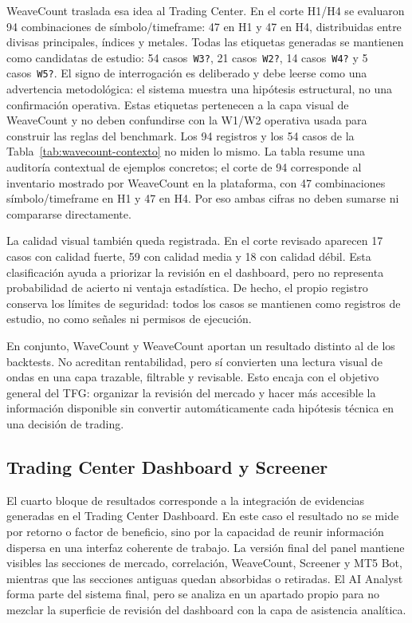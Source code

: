 WeaveCount traslada esa idea al Trading Center. En el corte H1/H4 se evaluaron
94 combinaciones de s\'imbolo/timeframe: 47 en H1 y 47 en H4, distribuidas entre
divisas principales, \'indices y metales. Todas las etiquetas generadas se mantienen
como candidatas de estudio: 54 casos~\texttt{W3?}, 21 casos~\texttt{W2?}, 14
casos~\texttt{W4?} y 5 casos~\texttt{W5?}. El signo de interrogaci\'on es
deliberado y debe leerse como una advertencia metodol\'ogica: el sistema muestra
una hip\'otesis estructural, no una confirmaci\'on operativa.
Estas etiquetas pertenecen a la capa visual de WeaveCount y no deben confundirse
con la W1/W2 operativa usada para construir las reglas del benchmark.
Los 94 registros y los 54 casos de la Tabla~\ref{tab:wavecount-contexto} no
miden lo mismo. La tabla resume una auditor\'ia contextual de ejemplos concretos;
el corte de 94 corresponde al inventario mostrado por WeaveCount en la
plataforma, con 47 combinaciones s\'imbolo/timeframe en H1 y 47 en H4. Por
eso ambas cifras no deben sumarse ni compararse directamente.

La calidad visual tambi\'en queda registrada. En el corte revisado aparecen 17
casos con calidad fuerte, 59 con calidad media y 18 con calidad d\'ebil. Esta
clasificaci\'on ayuda a priorizar la revisi\'on en el dashboard, pero no
representa probabilidad de acierto ni ventaja estad\'istica. De hecho, el propio
registro conserva los l\'imites de seguridad: todos los casos se mantienen
como registros de estudio, no como se\~nales ni permisos de ejecuci\'on.

En conjunto, WaveCount y WeaveCount aportan un resultado distinto al de los
backtests. No acreditan rentabilidad, pero s\'i convierten una lectura visual
de ondas en una capa trazable, filtrable y revisable. Esto encaja con el
objetivo general del TFG: organizar la revisi\'on del mercado y hacer m\'as
accesible la informaci\'on disponible sin convertir autom\'aticamente cada
hip\'otesis t\'ecnica en una decisi\'on de trading.

\subsection{Trading Center Dashboard y Screener}
\label{subsec:resultados-dashboard-screener}

El cuarto bloque de resultados corresponde a la integraci\'on de evidencias
generadas en el Trading Center Dashboard. En este caso el resultado no se mide
por retorno o factor de beneficio, sino por la capacidad de reunir informaci\'on
dispersa en una interfaz coherente de trabajo. La
versi\'on final del panel mantiene visibles las secciones de mercado,
correlaci\'on, WeaveCount, Screener y MT5 Bot, mientras que las secciones
antiguas quedan absorbidas o retiradas. El AI Analyst forma parte del sistema
final, pero se analiza en un apartado propio para no mezclar la superficie de
revisi\'on del dashboard con la capa de asistencia anal\'itica.

